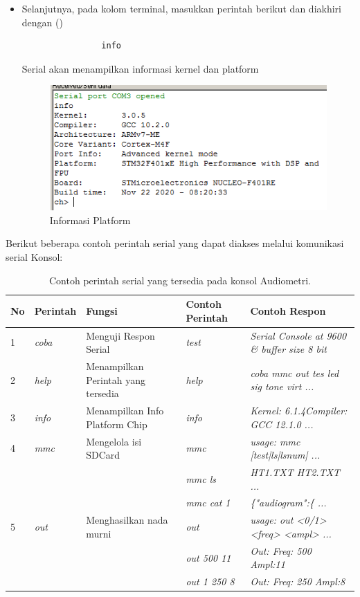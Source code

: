 \documentclass{article}
\begin{document}
\begin{enumerate}
\begin{itemize}
			\item Selanjutnya, pada kolom terminal,
			masukkan perintah berikut dan diakhiri dengan (\keys{\return})
			\begin{verbatim}
				info
			\end{verbatim}
			Serial akan menampilkan informasi kernel dan platform
			\begin{figure}[H]
				\centering
				\includegraphics[width=300pt]{images/software/hercules_text}
				\caption{Informasi Platform}
			\end{figure}
		\end{itemize}
		
	\end{enumerate}

	Berikut beberapa contoh perintah serial yang dapat diakses melalui komunikasi serial Konsol:
	
	\begin{table}[H]
		\renewcommand{\tablename}{Tabel}
		\centering
		\caption{Contoh perintah serial yang tersedia pada konsol Audiometri. \label{table:serial-code}}
		\begin{tabular}{| p{} | p{} | p{} | p{} | p{} |}
			\hline
			\textbf{No} & \textbf{Perintah} & \textbf{Fungsi} & \textbf{Contoh Perintah} & \textbf{Contoh Respon} \\
			\hline
			1 & \textit{coba} & Menguji Respon Serial & \textit{test} & \textit{Serial Console at 9600 \& buffer size 8 bit} \\
			\hline
			2 & \textit{help} & Menampilkan Perintah yang tersedia & \textit{help} & \textit{coba mmc out tes led sig tone virt ...} \\
			\hline
			3 & \textit{info} & Menampilkan Info Platform Chip & \textit{info} & \textit{Kernel: 6.1.4Compiler: GCC 12.1.0 ...} \\
			\hline
			4 & \textit{mmc} & Mengelola isi SDCard & \textit{mmc} & \textit{usage: mmc [test|ls|lsnum| ...} \\
			& & & \textit{mmc ls} & \textit{HT1.TXT HT2.TXT ...} \\
			& & & \textit{mmc cat 1} & \textit{\{"audiogram":\{ ...} \\
			\hline
			5 & \textit{out} & Menghasilkan nada murni &  \textit{out} & \textit{usage: out <0/1> <freq> <ampl> ...} \\
			& & & \textit{out 500 11} & \textit{Out: Freq:  500 Ampl:11} \\
			& & & \textit{out 1 250 8} & \textit{Out: Freq:  250 Ampl:8} \\
			\hline
		\end{tabular}
	\end{table}
	
\end{document}
